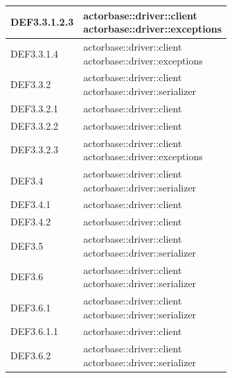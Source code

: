 \documentclass{scalatekids-article}
\begin{document}
\begin{longtable}[H]{|p{3.5cm}|p{7.5cm}|}
  \hline
  DEF3.3.1.2.3 & \multiLineCell[t]{actorbase::driver::client\\actorbase::driver::exceptions\\}\\
  \hline
  DEF3.3.1.4 & \multiLineCell[t]{actorbase::driver::client\\actorbase::driver::exceptions\\}\\
  \hline
  DEF3.3.2 & \multiLineCell[t]{actorbase::driver::client\\actorbase::driver::serializer\\}\\
  \hline
  DEF3.3.2.1 & \multiLineCell[t]{actorbase::driver::client\\}\\
  \hline
  DEF3.3.2.2 & \multiLineCell[t]{actorbase::driver::client\\}\\
  \hline
  DEF3.3.2.3 & \multiLineCell[t]{actorbase::driver::client\\actorbase::driver::exceptions\\}\\
  \hline
  DEF3.4 & \multiLineCell[t]{actorbase::driver::client\\actorbase::driver::serializer\\}\\
  \hline
  DEF3.4.1 & \multiLineCell[t]{actorbase::driver::client\\}\\
  \hline
  DEF3.4.2 & \multiLineCell[t]{actorbase::driver::client\\}\\
  \hline
  DEF3.5 & \multiLineCell[t]{actorbase::driver::client\\actorbase::driver::serializer\\}\\
  \hline
  DEF3.6 & \multiLineCell[t]{actorbase::driver::client\\actorbase::driver::serializer\\}\\
  \hline
  DEF3.6.1 & \multiLineCell[t]{actorbase::driver::client\\actorbase::driver::serializer\\}\\
  \hline
  DEF3.6.1.1 & \multiLineCell[t]{actorbase::driver::client\\}\\
  \hline
  DEF3.6.2 & \multiLineCell[t]{actorbase::driver::client\\actorbase::driver::serializer\\}\\

\end{longtable}
\end{document}
